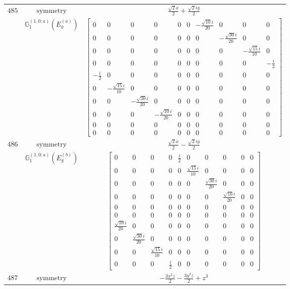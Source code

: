 \documentclass[fleqn,8pt,landscape]{jsarticle}
\begin{document}
\begin{longtable}{ccc}
$ 485 $ & $ \text{symmetry} $ & $ \frac{\sqrt{2} x}{2} + \frac{\sqrt{2} i y}{2} $ \\
$  $ & $ \mathbb{G}_{1}^{(1,0;a)}(E_{g}^{(a)}) $ & $ \begin{bmatrix} 0 & 0 & 0 & 0 & 0 & 0 & - \frac{\sqrt{10} i}{20} & 0 & 0 & 0 \\ 0 & 0 & 0 & 0 & 0 & 0 & 0 & - \frac{\sqrt{30} i}{20} & 0 & 0 \\ 0 & 0 & 0 & 0 & 0 & 0 & 0 & 0 & - \frac{\sqrt{15} i}{10} & 0 \\ 0 & 0 & 0 & 0 & 0 & 0 & 0 & 0 & 0 & - \frac{i}{2} \\ - \frac{i}{2} & 0 & 0 & 0 & 0 & 0 & 0 & 0 & 0 & 0 \\ 0 & - \frac{\sqrt{15} i}{10} & 0 & 0 & 0 & 0 & 0 & 0 & 0 & 0 \\ 0 & 0 & - \frac{\sqrt{30} i}{20} & 0 & 0 & 0 & 0 & 0 & 0 & 0 \\ 0 & 0 & 0 & - \frac{\sqrt{10} i}{20} & 0 & 0 & 0 & 0 & 0 & 0 \\ 0 & 0 & 0 & 0 & 0 & 0 & 0 & 0 & 0 & 0 \\ 0 & 0 & 0 & 0 & 0 & 0 & 0 & 0 & 0 & 0 \end{bmatrix} $ \\ \hline
$ 486 $ & $ \text{symmetry} $ & $ \frac{\sqrt{2} x}{2} - \frac{\sqrt{2} i y}{2} $ \\
$  $ & $ \mathbb{G}_{1}^{(1,0;a)}(E_{g}^{(b)}) $ & $ \begin{bmatrix} 0 & 0 & 0 & 0 & \frac{i}{2} & 0 & 0 & 0 & 0 & 0 \\ 0 & 0 & 0 & 0 & 0 & \frac{\sqrt{15} i}{10} & 0 & 0 & 0 & 0 \\ 0 & 0 & 0 & 0 & 0 & 0 & \frac{\sqrt{30} i}{20} & 0 & 0 & 0 \\ 0 & 0 & 0 & 0 & 0 & 0 & 0 & \frac{\sqrt{10} i}{20} & 0 & 0 \\ 0 & 0 & 0 & 0 & 0 & 0 & 0 & 0 & 0 & 0 \\ 0 & 0 & 0 & 0 & 0 & 0 & 0 & 0 & 0 & 0 \\ \frac{\sqrt{10} i}{20} & 0 & 0 & 0 & 0 & 0 & 0 & 0 & 0 & 0 \\ 0 & \frac{\sqrt{30} i}{20} & 0 & 0 & 0 & 0 & 0 & 0 & 0 & 0 \\ 0 & 0 & \frac{\sqrt{15} i}{10} & 0 & 0 & 0 & 0 & 0 & 0 & 0 \\ 0 & 0 & 0 & \frac{i}{2} & 0 & 0 & 0 & 0 & 0 & 0 \end{bmatrix} $ \\ \hline
$ 487 $ & $ \text{symmetry} $ & $ - \frac{3 x^{2} z}{2} - \frac{3 y^{2} z}{2} + z^{3} $ \\

\end{longtable}
\end{document}

